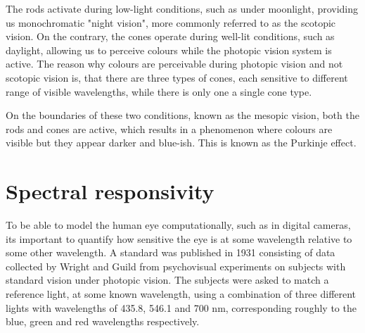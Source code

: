 The rods activate during low-light conditions, such as under moonlight, providing us monochromatic "night vision", more commonly referred to as the scotopic vision. On the contrary, the cones operate during well-lit conditions, such as daylight, allowing us to perceive colours while the photopic vision system is active. The reason why colours are perceivable during photopic vision and not scotopic vision is, that there are three types of cones, each sensitive to different range of visible wavelengths, while there is only one a single cone type.  \cite[4-5]{measuringcolour}

On the boundaries of these two conditions, known as the mesopic vision, both the rods and cones are active, which results in a phenomenon where colours are visible but they appear darker and blue-ish. This is known as the Purkinje effect. \cite[5]{measuringcolour}

\section{Spectral responsivity}



To be able to model the human eye computationally, such as in digital cameras, its important to quantify how sensitive the eye is at some wavelength relative to some other wavelength. A standard was published in 1931 consisting of data collected by Wright and Guild from psychovisual experiments on subjects with standard vision under photopic vision. The subjects were asked to match a reference light, at some known wavelength, using a combination of three different lights with wavelengths of 435.8, 546.1 and 700 nm, corresponding roughly to the blue, green and red wavelengths respectively. \cite{wrightetguild}

